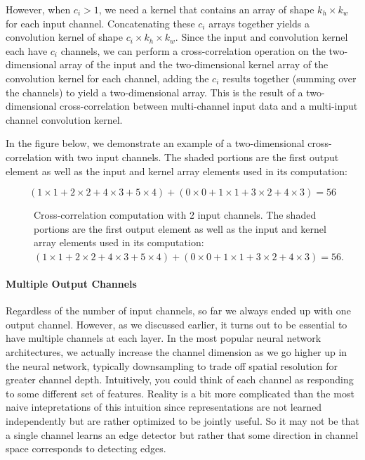 However, when $c_i>1$, we need a kernel that contains an array of shape $k_h\times k_w$ for each input channel. Concatenating these $c_i$ arrays together yields a convolution kernel of shape $c_i\times k_h\times k_w$. Since the input and convolution kernel each have $c_i$ channels, we can perform a cross-correlation operation on the two-dimensional array of the input and the two-dimensional kernel array of the convolution kernel for each channel, adding the $c_i$ results together (summing over the channels) to yield a two-dimensional array. This is the result of a two-dimensional cross-correlation between multi-channel input data and a multi-input channel convolution kernel.

In the figure below, we demonstrate an example of a two-dimensional cross-correlation with two input channels. The shaded portions are the first output element as well as the input and kernel array elements used in its computation:

$$(1 \times 1+2\times2+4\times3+5\times4)+(0\times0+1 \times 1+3\times2+4\times3)=56$$

\begin{figure}[hpt]
	\centering
	
	\caption{Cross-correlation computation with 2 input channels. The shaded portions are the first output element as well as the input and kernel array elements used in its computation:  $(1 \times 1+2 \times 2+4\times3+5\times4)+(0\times0+1 \times 1+3\times2+4\times3)=56.$}
	\label{fig:conv_multi_in}
\end{figure}

\paragraph{Multiple Output Channels}

Regardless of the number of input channels, so far we always ended up with one output channel. However, as we discussed earlier, it turns out to be essential to have multiple channels at each layer. In the most popular neural network architectures, we actually increase the channel dimension as we go higher up in the neural network, typically downsampling to trade off spatial resolution for greater channel depth. Intuitively, you could think of each channel as responding to some different set of features. Reality is a bit more complicated than the most naive intepretations of this intuition since representations are not learned independently but are rather optimized to be jointly useful. So it may not be that a single channel learns an edge detector but rather that some direction in channel space corresponds to detecting edges.

